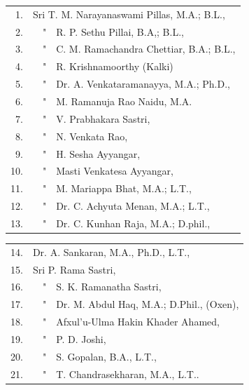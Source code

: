 \documentclass[11pt, openany]{book}
\begin{document}
\begin{table}[h!]
   \englishfont\centering
   \begin{tabular}{rl}
 1.& Sri T. M. Narayanaswami Pillas, M.A.; B.L.,\\
 2.& ~~"~~R. P. Sethu Pillai, B.A,; B.L.,\\
 3.& ~~"~~C. M. Ramachandra Chettiar, B.A.; B.L.,\\
 4.& ~~"~~R. Krishnamoorthy (Kalki) \\
 5.& ~~"~~Dr. A. Venkataramanayya, M.A.; Ph.D.,\\
 6.& ~~"~~M. Ramanuja Rao Naidu, M.A.\\
 7.& ~~"~~V. Prabhakara Sastri,\\
 8.& ~~"~~N. Venkata Rao,\\
 9.& ~~"~~H. Sesha Ayyangar,\\
 10.& ~~"~~Masti Venkatesa Ayyangar,\\
 11.& ~~"~~M. Mariappa Bhat, M.A.; L.T.,\\
 12.& ~~"~~Dr. C. Achyuta Menan, M.A.; L.T.,\\
 13.& ~~"~~Dr. C. Kunhan Raja, M.A.; D.phil., \\
    \end{tabular}
\end{table}
\newpage
\begin{table}[h!]
   \englishfont\centering
   \begin{tabular}{rl}
 14.& Dr. A. Sankaran, M.A., Ph.D., L.T.,\\
 15.& Sri P. Rama Sastri,\\
 16.& ~~"~~S. K. Ramanatha Sastri,\\
 17.& ~~"~~Dr. M. Abdul Haq, M.A.; D.Phil., (Oxen),\\
 18.& ~~"~~Afxul'u-Ulma Hakin Khader Ahamed,\\
 19.& ~~"~~P. D. Joshi,\\
 20.& ~~"~~S. Gopalan, B.A., L.T.,\\
 21.& ~~"~~T. Chandrasekharan, M.A., L.T.. \\
    \end{tabular}
\end{table}
\end{document}
